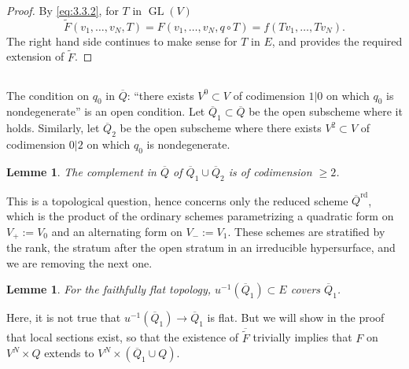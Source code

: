 \documentclass[11pt,a4paper]{article}
\theoremstyle{plain}
\newtheorem{lemma}[theorem]{Lemme}
\theoremstyle{definition}
\DeclareMathOperator{\GL}{GL}
\begin{document}
\begin{proof}
By \eqref{eq:3.3.2}, for $T$ in $\GL(V)$
\[
\widetilde{F}(v_1,\dots,v_N,T) = F(v_1,\dots,v_N, q \circ T) = f(Tv_1,\dots,Tv_N).
\]
The right hand side continues to make sense for $T$ in $E$, and provides the required extension of $\widetilde{F}$.
\end{proof}

\subsection{}
The condition on $q_0$ in $\overline{Q}$: ``there exists $V^0 \subset V$ of codimension $1|0$ on which $q_0$ is nondegenerate'' is an open condition. Let $\overline{Q}_1 \subset \overline{Q}$ be the open subscheme where it holds. Similarly, let $\overline{Q}_2$ be the open subscheme where there exists $V^2 \subset V$ of codimension $0|2$ on which $q_0$ is nondegenerate.

\begin{lemma}\label{lem:3.8}
The complement in $\overline{Q}$ of $\overline{Q}_1 \cup \overline{Q}_2$ is of codimension $\geq 2$.
\end{lemma}

This is a topological question, hence concerns only the reduced scheme $\overline{Q}^{\mathrm{rd}}$, which is the product of the ordinary schemes parametrizing a quadratic form on $V_+ := V_0$ and an alternating form on $V_- := V_1$. These schemes are stratified by the rank, the stratum after the open stratum in an irreducible hypersurface, and we are removing the next one.

\begin{lemma}\label{lem:3.9}
For the faithfully flat topology, $u^{-1}(\overline{Q}_1) \subset E$ covers $\overline{Q}_1$.
\end{lemma}

Here, it is not true that $u^{-1}(\overline{Q}_1) \to \overline{Q}_1$ is flat. But we will show in the proof that local sections exist, so that the existence of $\overline{\widetilde{F}}$ trivially implies that $F$ on $V^N \times Q$ extends to $V^N \times (\overline{Q}_1 \cup Q)$.
\end{document}
